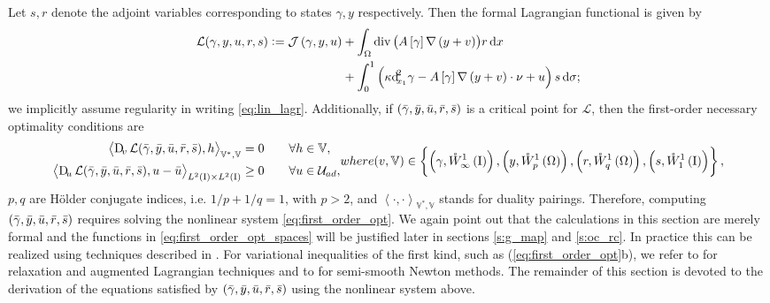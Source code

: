 \documentclass[final]{siamltex}
\begin{document}
Let $s, r$ denote the adjoint variables corresponding to states $\gamma, y$ respectively. 
Then the formal Lagrangian functional is given by
\begin{equation}\begin{aligned}\label{eq:lin_lagr}
	{\mathcal{L}} (\gamma,y,u,r,s) 
		:= {\mathcal{J}\del{\gamma, y, u}}  &+\int_\Omega \operatorname{div}{\del{{A\sbr{\gamma}{\nabla} \del{y+v}}}}r \dif x \\
		&+ \int_0^1 \del{\kappa {\operatorname{d}\!}^2_{x_1}\gamma - A\sbr\gamma{\nabla}\del{y+v}\cdot\nu + u}s \dif\sigma ;
\end{aligned}\end{equation}
we implicitly assume regularity in writing \eqref{eq:lin_lagr}. 
Additionally, if ${\del{{\bar{\gamma}},{\bar{y}},{\bar{u}},{\bar{r}},{\bar{s}}}}$ is a critical point for ${\mathcal{L}}$, then the first-order
necessary optimality conditions are
\begin{subequations} \label{eq:first_order_opt}
	\begin{align}
		{\left\langle {\Dif_{v}{\mathcal{L}}{\del{{\bar{\gamma}},{\bar{y}},{\bar{u}},{\bar{r}},{\bar{s}}}},h} \right\rangle}_{\mathbb{V}^*,\mathbb{V}}   &= 0   
		\qquad \forall h \in \mathbb{V},  \\
		{{\mathop{{\left\langle {{\Dif_{u}{\mathcal{L}}{\del{{\bar{\gamma}},{\bar{y}},{\bar{u}},{\bar{r}},{\bar{s}}}},u-{\bar{u}}}} \right\rangle}}}_{{{L^2\del{{{\text{\rm I}}}}}}\times{{L^2\del{{{\text{\rm I}}}}}}}}   &\ge 0 
                \qquad \forall u \in \mathcal{U}_{ad},
	\end{align}
where 
\begin{align}\label{eq:first_order_opt_spaces}
    \del{v,\mathbb{V}} \in \set{ \del{\gamma,{{\mathring{W}^{1}_{\infty}\del{{\text{\rm I}}}}}}, \del{y,{{\mathring{W}^{1}_{p}\del{\Omega}}}}, \del{r,{{\mathring{W}^{{1}}_{{q}}\del{{\Omega}}}}}, \del{s,{{\mathring{W}^{1}_{1}\del{{\text{\rm I}}}}}} } ,
\end{align}
\end{subequations}
$p,q$ are H\"older conjugate indices, i.e. $1/p+1/q=1$, with $p>2$, and ${\left\langle {\cdot,\cdot} \right\rangle}_{\mathbb{V}^*,\mathbb{V}}$ stands for duality pairings. 
Therefore, computing ${\del{{\bar{\gamma}},{\bar{y}},{\bar{u}},{\bar{r}},{\bar{s}}}}$ requires solving the nonlinear system
\eqref{eq:first_order_opt}. We again point out that the calculations in this section are merely formal and the functions in \eqref{eq:first_order_opt_spaces} will be justified later in sections \ref{s:g_map} and \ref{s:oc_rc}. In practice this can be realized using techniques described in 
\cite{HAntil_RHoppe_CLinsenmann_2007a, CTKelley_1999a, FTroltzsch_2010a}.
For variational inequalities of the first kind, such as (\ref{eq:first_order_opt}b), we refer to 
\cite{RGlowinski_1984a} for relaxation and augmented Lagrangian 
techniques and to \cite{JCDReyes_MHintermuller_2011a} for semi-smooth Newton methods.
The remainder of this section is devoted to the derivation of the equations satisfied by ${\del{{\bar{\gamma}},{\bar{y}},{\bar{u}},{\bar{r}},{\bar{s}}}}$ using the nonlinear system above.
\end{document}
